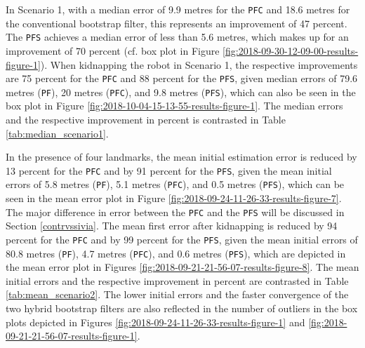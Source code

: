 
In Scenario 1, with a median error of 9.9 metres for the \texttt{PFC} and 18.6 metres for the conventional bootstrap filter, this represents an improvement of 47 percent. The \texttt{PFS} achieves a median error of less than 5.6 metres, which makes up for an improvement of 70 percent (cf. box plot in Figure \ref{fig:2018-09-30-12-09-00-results-figure-1}). When kidnapping the robot in Scenario 1, the respective improvements are 75 percent for the \texttt{PFC} and 88 percent for the \texttt{PFS}, given median errors of 79.6 metres (\texttt{PF}), 20 metres (\texttt{PFC}), and 9.8 metres (\texttt{PFS}), which can also be seen in the box plot in Figure \ref{fig:2018-10-04-15-13-55-results-figure-1}. The median errors and the respective improvement in percent is contrasted in Table \ref{tab:median_scenario1}.




In the presence of four landmarks, the mean initial estimation error is reduced by 13 percent for the \texttt{PFC} and by 91 percent for the \texttt{PFS}, given the mean initial errors of 5.8 metres (\texttt{PF}), 5.1 metres (\texttt{PFC}), and 0.5 metres (\texttt{PFS}), which can be seen in the mean error plot in Figure \ref{fig:2018-09-24-11-26-33-results-figure-7}. The major difference in error between the \texttt{PFC} and the \texttt{PFS} will be discussed in Section \ref{contrvssivia}. The mean first error after kidnapping is reduced by 94 percent for the \texttt{PFC} and by 99 percent for the \texttt{PFS}, given the mean initial errors of 80.8 metres (\texttt{PF}), 4.7 metres (\texttt{PFC}), and 0.6 metres (\texttt{PFS}), which are depicted in the mean error plot in Figures \ref{fig:2018-09-21-21-56-07-results-figure-8}. The mean initial errors and the respective improvement in percent are contrasted in Table \ref{tab:mean_scenario2}. The lower initial errors and the faster convergence of the two hybrid bootstrap filters are also reflected in the number of outliers in the box plots depicted in Figures \ref{fig:2018-09-24-11-26-33-results-figure-1} and \ref{fig:2018-09-21-21-56-07-results-figure-1}. 

